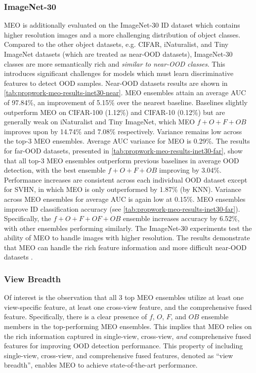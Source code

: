 \subsubsection{ImageNet-30} 
MEO is additionally evaluated on the ImageNet-30 ID dataset which contains higher resolution images and a more challenging distribution of object classes. Compared to the other object datasets, e.g. CIFAR, iNaturalist, and Tiny ImageNet datasets (which are treated as near-OOD datasets), ImageNet-30 classes are more semantically rich and \emph{similar to near-OOD classes}. This introduces significant challenges for models which must learn discriminative features to detect OOD samples. 
Near-OOD datasets results are shown in \ref{tab:propwork-meo-results-inet30-near}. MEO ensembles attain an average AUC of 97.84\%, an improvement of 5.15\% over the nearest baseline. Baselines slightly outperform MEO on CIFAR-100 (1.12\%) and CIFAR-10 (0.12\%) but are generally weak on iNaturalist and Tiny ImageNet, which MEO $f+O+F+OB$ improves upon by 14.74\% and 7.08\% respectively. Variance remains low across the top-3 MEO ensembles. Average AUC variance for MEO is 0.29\%.
The results for far-OOD datasets, presented in \ref{tab:propwork-meo-results-inet30-far}, show that all top-3 MEO ensembles outperform previous baselines in average OOD detection, with the best ensemble $f+O+F+OB$ improving by 3.04\%. Performance increases are consistent across each individual OOD dataset except for SVHN, in which MEO is only outperformed by 1.87\% (by KNN). Variance across MEO ensembles for average AUC is again low at 0.15\%.
MEO ensembles improve ID classification accuracy (see \ref{tab:propwork-meo-results-inet30-far}). Specifically, the $f+O+F+OF+OB$ ensemble increases accuracy by 6.52\%, with other ensembles performing similarly. The ImageNet-30 experiments test the ability of MEO to handle images with higher resolution. The results demonstrate that MEO can handle the rich feature information and more difficult near-OOD datasets \cite{koner2021oodformer,li2023rethinking}. 

\subsubsection{View Breadth}
Of interest is the observation that all 3 top MEO ensembles utilize at least one view-specific feature, at least one cross-view feature, and the comprehensive fused feature. Specifically, there is a clear presence of $f$, $O$, $F$, and $OB$ ensemble members in the top-performing MEO ensembles. This implies that MEO relies on the rich information captured in single-view, cross-view, \textit{and} comprehensive fused features for improving OOD detection performance. This property of including single-view, cross-view, and comprehensive fused features, denoted as ``view breadth'', enables MEO to achieve state-of-the-art performance.

